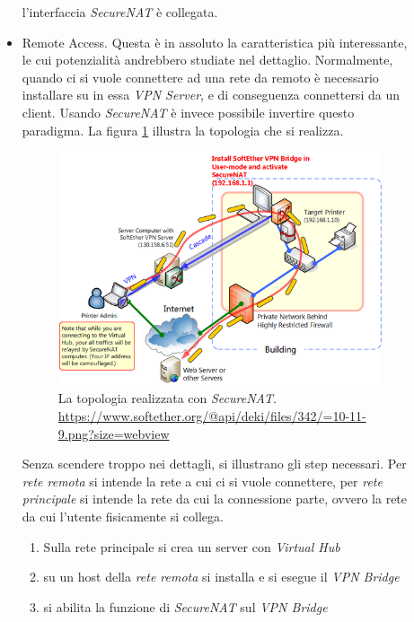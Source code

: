 \begin{description}
\begin{itemize}
    l'interfaccia \textit{SecureNAT} è collegata.
    \item Remote Access. Questa è in assoluto la caratteristica più interessante, le cui potenzialità andrebbero studiate
    nel dettaglio. Normalmente, quando ci si vuole connettere ad una rete da remoto è
    necessario installare su in essa \textit{VPN Server}, e di conseguenza connettersi da un client. Usando \textit{SecureNAT}
    è invece possibile invertire questo paradigma. La figura \ref{fig:securenat} illustra la topologia che si realizza.\\
    \begin{figure}
      \includegraphics[scale=0.55]{img/softether_securenat}
      \caption[La topologia realizzata con \textit{SecureNAT}]{
        La topologia realizzata con \textit{SecureNAT}.
        \url{https://www.softether.org/@api/deki/files/342/=10-11-9.png?size=webview}}
        \label{fig:securenat}
    \end{figure}
    Senza scendere troppo nei dettagli, si illustrano gli step necessari. Per \textit{rete remota} si intende la rete a cui
    ci si vuole connettere, per \textit{rete principale} si intende la rete da cui la connessione parte, ovvero
    la rete da cui l'utente fisicamente si collega.
    \begin{enumerate}
      \item Sulla rete principale si crea un server con \textit{Virtual Hub}
      \item su un host della \textit{rete remota} si installa e si esegue il \textit{VPN Bridge}
      \item si abilita la funzione di \textit{SecureNAT} sul \textit{VPN Bridge}

\end{enumerate}
\end{itemize}
\end{description}
